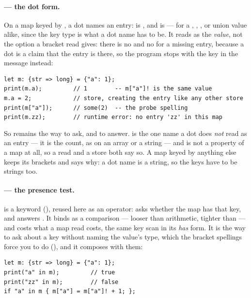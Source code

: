 \paragraph{ --- the dot form.} On a map keyed by , a
dot names an entry:  is , and  is
 --- for a , , ,  or
union value alike, since the key type is what a dot name has to be. It
reads as the \emph{value}, not the option a bracket read gives: there is
no  and no  for a missing entry, because a dot is a
claim that the entry is there, so the program stops with the key in the
message instead:

\begin{lstlisting}
let m: {str => long} = {"a": 1};
print(m.a);         // 1        -- m["a"]! is the same value
m.a = 2;            // store, creating the entry like any other store
print(m["a"]);      // some(2)  -- the probe spelling
print(m.zz);        // runtime error: no entry 'zz' in this map
\end{lstlisting}

\noindent So  remains the way to ask, and  to
answer.  is the one name a dot does \emph{not} read as an
entry --- it is the count, as on an array or a string --- and 
is not a property of a map at all, so a read and a store both say so. A
map keyed by anything else keeps its brackets and says why: a dot name
is a string, so the keys have to be strings too.

\paragraph{ --- the presence test.}  is a
keyword (), reused here as an operator: 
asks whether the map has that key, and answers . It binds as a
comparison --- looser than arithmetic, tighter than \ic{\&\&} --- and
costs what a map read costs, the same key scan in its \emph{has} form.
It is the way to ask about a key without naming the value's type, which
the bracket spellings force you to do (), and it
composes with them:

\begin{lstlisting}
let m: {str => long} = {"a": 1};
print("a" in m);         // true
print("zz" in m);        // false
if "a" in m { m["a"] = m["a"]! + 1; };
\end{lstlisting}


